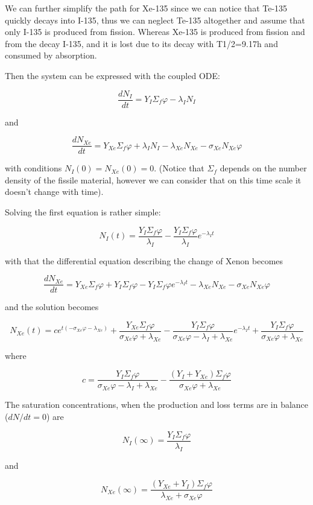 We can further simplify the path for Xe-135 since we can notice that Te-135 quickly decays into I-135, thus we can neglect Te-135 altogether and assume that only I-135 is produced from fission. Whereas Xe-135 is produced from fission and from the decay I-135, and it is lost due to its decay with T1/2=9.17h and consumed by absorption. 

Then the system can be expressed with the coupled ODE:


$$ \frac{dN_I}{dt}=Y_I \Sigma_f\varphi-\lambda_I N_I $$

and

$$ \frac{dN_{Xe}}{dt}=Y_{Xe}\Sigma_f\varphi + \lambda_IN_I -\lambda_{Xe}N_{Xe} - \sigma_{Xe}N_{Xe}\varphi  $$

with conditions $N_I(0)=N_{Xe}(0)=0$. (Notice that $\Sigma_f$ depends on the number density of the fissile material, however we can consider that on this time scale it doesn't change with time).

Solving the first equation is rather simple:

$$ N_I(t)=\frac{Y_I\Sigma_f\varphi}{\lambda_I} - \frac{Y_I\Sigma_f\varphi}{\lambda_I}e^{-\lambda_It} $$

\noindent with that the differential equation describing the change of Xenon becomes

$$ \frac{dN_{Xe}}{dt}=Y_{Xe}\Sigma_f\varphi + Y_I\Sigma_f\varphi - Y_I\Sigma_f\varphi e^{-\lambda_It} -\lambda_{Xe}N_{Xe} - \sigma_{Xe}N_{Xe}\varphi  $$

\noindent and the solution becomes

$$ N_{Xe}(t) = c e^{t(-\sigma_{Xe}\varphi - \lambda_{Xe})} + \frac{Y_{Xe}\Sigma_f\varphi}{\sigma_{Xe}\varphi + \lambda_{Xe}} - \frac{Y_I\Sigma_f\varphi}{\sigma_{Xe}\varphi-\lambda_I + \lambda_{Xe}}e^{-\lambda_It} + \frac{Y_{I}\Sigma_f\varphi}{\sigma_{Xe}\varphi + \lambda_{Xe}}  $$

\noindent where 

$$ c= \frac{Y_I\Sigma_f\varphi}{\sigma_{Xe}\varphi-\lambda_I + \lambda_{Xe}}  -\frac{(Y_{I}+Y_{Xe})\Sigma_f\varphi}{\sigma_{Xe}\varphi + \lambda_{Xe}}   $$


The saturation concentrations, when the production and loss terms are in balance ($dN/dt = 0$) are

$$N_I(\infty) = \frac{Y_I\Sigma_f\varphi}{\lambda_I} $$

\noindent and 

$$N_{Xe}(\infty) = \frac{(Y_{Xe}+Y_I)\Sigma_f\varphi}{\lambda_{Xe} + \sigma_{Xe}\varphi} $$

